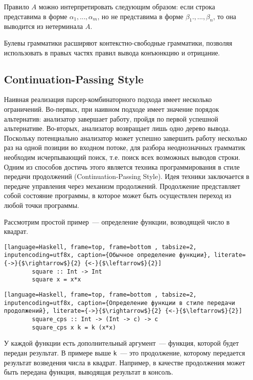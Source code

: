 Правило $A$ можно интерпретировать следующим образом: если строка представима в форме $\alpha_1 ,...,\alpha_m$, но не представима в форме $\beta_1 .,...,\beta_n$, то она выводится из нетерминала $A$.

Булевы грамматики расширяют контекстно-свободные грамматики, позволяя использовать в правых частях правил вывода конъюнкцию и отрицание.

    \subsection{Continuation-Passing Style}
    Наивная реализация парсер-комбинаторного подхода имеет несколько ограничений. Во-первых, при наивном подходе имеет значение порядок альтернатив: анализатор завершает работу, пройдя по первой успешной альтернативе. Во-вторых, анализатор возвращает лишь одно дерево вывода. Поскольку потенциально анализатор может успешно завершить работу несколько раз на одной позиции во входном потоке, для разбора неоднозначных грамматик необходим исчерпывающий поиск, т.е. поиск всех возможных выводов строки. Одним из способов достичь этого является техника программирования в стиле передачи продолжений (Continuation-Passing Style). Идея техники заключается в передаче управления через механизм продолжений. Продолжение представляет собой состояние программы, в которое может быть осуществлен переход из любой точки программы.
    
    Рассмотрим простой пример~--- определение функции, возводящей число в квадрат. 
    
        \begin{lstlisting}[language=Haskell, frame=top, frame=bottom , tabsize=2, inputencoding=utf8x, caption={Обычное определение функции}, literate={->}{$\rightarrow$}{2} {<-}{$\leftarrow$}{2}]
        square :: Int -> Int
        square x = x*x
        \end{lstlisting}

        \begin{lstlisting}[language=Haskell, frame=top, frame=bottom , tabsize=2, inputencoding=utf8x, caption={Определение функции в стиле передачи продолжений}, literate={->}{$\rightarrow$}{2} {<-}{$\leftarrow$}{2}]
        square_cps :: Int -> (Int -> c) -> c
        square_cps x k = k (x*x)
        \end{lstlisting}
        
    У каждой функции есть дополнительный аргумент~--- функция, которой будет передан результат. В примере выше \lstinline[language=Haskell]{k}~--- это продолжение, которому передается результат возведения числа в квадрат. Например, в качестве продолжения может быть передана функция, выводящая результат в консоль.
        
